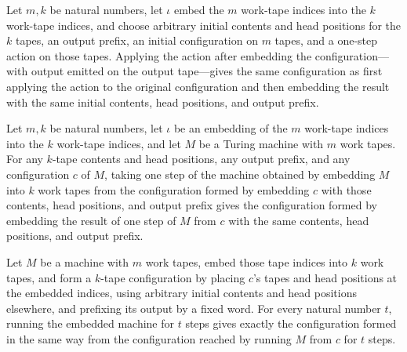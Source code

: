 \begin{lemma}
\label{Turing.embedEmit_apply}
\leanok
{}
Let $m,k$ be natural numbers, let $\iota$ embed the $m$ work-tape indices into the $k$
work-tape indices, and choose arbitrary initial contents and head positions for the $k$
tapes, an output prefix, an initial configuration on $m$ tapes, and a one-step action on
those tapes. Applying the action after embedding the configuration—with output emitted
on the output tape—gives the same configuration as first applying the action to the
original configuration and then embedding the result with the same initial contents,
head positions, and output prefix.
\end{lemma}

\begin{lemma}
\label{Turing.embedEmit_step}
\leanok
{}
Let $m,k$ be natural numbers, let $\iota$ be an embedding of the $m$ work-tape indices
into the $k$ work-tape indices, and let $M$ be a Turing machine with $m$ work tapes. For
any $k$-tape contents and head positions, any output prefix, and any configuration $c$
of $M$, taking one step of the machine obtained by embedding $M$ into $k$ work tapes
from the configuration formed by embedding $c$ with those contents, head positions, and
output prefix gives the configuration formed by embedding the result of one step of $M$
from $c$ with the same contents, head positions, and output prefix.
\end{lemma}

\begin{theorem}
\label{Turing.embedEmitTM_runFrom}
\leanok
{}
Let $M$ be a machine with $m$ work tapes, embed those tape indices into $k$ work tapes,
and form a $k$-tape configuration by placing $c$'s tapes and head positions at the
embedded indices, using arbitrary initial contents and head positions elsewhere, and
prefixing its output by a fixed word. For every natural number $t$, running the embedded
machine for $t$ steps gives exactly the configuration formed in the same way from the
configuration reached by running $M$ from $c$ for $t$ steps.
\end{theorem}

